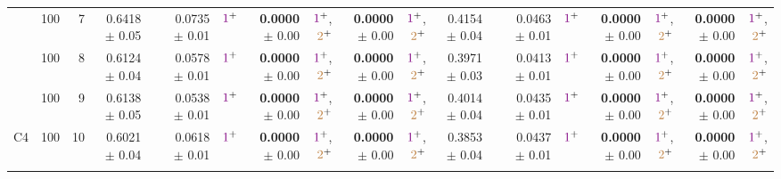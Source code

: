 \begin{table}
\begin{tiny}
\begin{tabular}[t]{rrrrrrrrrrrrrrrrrrr}
 & 100 & 7 & 0.6418 $\pm$ 0.05 &  & 0.0735 $\pm$ 0.01 & $\textcolor{violet}{1}^{+}$ & \textbf{0.0000} $\pm$ 0.00 & $\textcolor{violet}{1}^{+}$,$\textcolor{brown}{2}^{+}$ & \textbf{0.0000} $\pm$ 0.00 & $\textcolor{violet}{1}^{+}$,$\textcolor{brown}{2}^{+}$ & 0.4154 $\pm$ 0.04 &  & 0.0463 $\pm$ 0.01 & $\textcolor{violet}{1}^{+}$ & \textbf{0.0000} $\pm$ 0.00 & $\textcolor{violet}{1}^{+}$,$\textcolor{brown}{2}^{+}$ & \textbf{0.0000} $\pm$ 0.00 & $\textcolor{violet}{1}^{+}$,$\textcolor{brown}{2}^{+}$\\

 & 100 & 8 & 0.6124 $\pm$ 0.04 &  & 0.0578 $\pm$ 0.01 & $\textcolor{violet}{1}^{+}$ & \textbf{0.0000} $\pm$ 0.00 & $\textcolor{violet}{1}^{+}$,$\textcolor{brown}{2}^{+}$ & \textbf{0.0000} $\pm$ 0.00 & $\textcolor{violet}{1}^{+}$,$\textcolor{brown}{2}^{+}$ & 0.3971 $\pm$ 0.03 &  & 0.0413 $\pm$ 0.01 & $\textcolor{violet}{1}^{+}$ & \textbf{0.0000} $\pm$ 0.00 & $\textcolor{violet}{1}^{+}$,$\textcolor{brown}{2}^{+}$ & \textbf{0.0000} $\pm$ 0.00 & $\textcolor{violet}{1}^{+}$,$\textcolor{brown}{2}^{+}$\\

 & 100 & 9 & 0.6138 $\pm$ 0.05 &  & 0.0538 $\pm$ 0.01 & $\textcolor{violet}{1}^{+}$ & \textbf{0.0000} $\pm$ 0.00 & $\textcolor{violet}{1}^{+}$,$\textcolor{brown}{2}^{+}$ & \textbf{0.0000} $\pm$ 0.00 & $\textcolor{violet}{1}^{+}$,$\textcolor{brown}{2}^{+}$ & 0.4014 $\pm$ 0.04 &  & 0.0435 $\pm$ 0.01 & $\textcolor{violet}{1}^{+}$ & \textbf{0.0000} $\pm$ 0.00 & $\textcolor{violet}{1}^{+}$,$\textcolor{brown}{2}^{+}$ & \textbf{0.0000} $\pm$ 0.00 & $\textcolor{violet}{1}^{+}$,$\textcolor{brown}{2}^{+}$\\

\multirow{-10}{*}{\raggedleft\arraybackslash C4} & 100 & 10 & 0.6021 $\pm$ 0.04 &  & 0.0618 $\pm$ 0.01 & $\textcolor{violet}{1}^{+}$ & \textbf{0.0000} $\pm$ 0.00 & $\textcolor{violet}{1}^{+}$,$\textcolor{brown}{2}^{+}$ & \textbf{0.0000} $\pm$ 0.00 & $\textcolor{violet}{1}^{+}$,$\textcolor{brown}{2}^{+}$ & 0.3853 $\pm$ 0.04 &  & 0.0437 $\pm$ 0.01 & $\textcolor{violet}{1}^{+}$ & \textbf{0.0000} $\pm$ 0.00 & $\textcolor{violet}{1}^{+}$,$\textcolor{brown}{2}^{+}$ & \textbf{0.0000} $\pm$ 0.00 & $\textcolor{violet}{1}^{+}$,$\textcolor{brown}{2}^{+}$\\
\bottomrule{}
\end{tabular}
\end{tiny}
\end{table}
